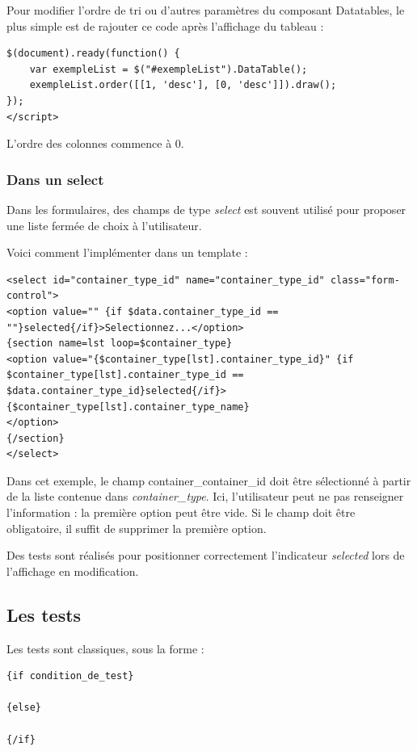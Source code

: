 Pour modifier l'ordre de tri ou d'autres paramètres du composant Datatables, le plus simple est de rajouter ce code après l'affichage du tableau :

\begin{lstlisting}
$(document).ready(function() {
	var exempleList = $("#exempleList").DataTable();
	exempleList.order([[1, 'desc'], [0, 'desc']]).draw();
});
</script>
\end{lstlisting}

L'ordre des colonnes commence à 0.

\subsubsection{Dans un select}

Dans les formulaires, des champs de type \textit{select} est souvent utilisé pour proposer une liste fermée de choix à l'utilisateur. 

Voici comment l'implémenter dans un template :

\begin{lstlisting}
<select id="container_type_id" name="container_type_id" class="form-control">
<option value="" {if $data.container_type_id == ""}selected{/if}>Selectionnez...</option>
{section name=lst loop=$container_type}
<option value="{$container_type[lst].container_type_id}" {if $container_type[lst].container_type_id == $data.container_type_id}selected{/if}>
{$container_type[lst].container_type_name}
</option>
{/section}
</select>
\end{lstlisting}

Dans cet exemple, le champ container\_container\_id doit être sélectionné à partir de la liste contenue dans \textit{container\_type}. Ici, l'utilisateur peut ne pas renseigner l'information : la première option peut être vide. Si le champ doit être obligatoire, il suffit de supprimer la première option.

Des tests sont réalisés pour positionner correctement l'indicateur \textit{selected} lors de l'affichage en modification.

\subsection{Les tests}

Les tests sont classiques, sous la forme : 
\begin{lstlisting}
{if condition_de_test}

{else}

{/if}
\end{lstlisting}

